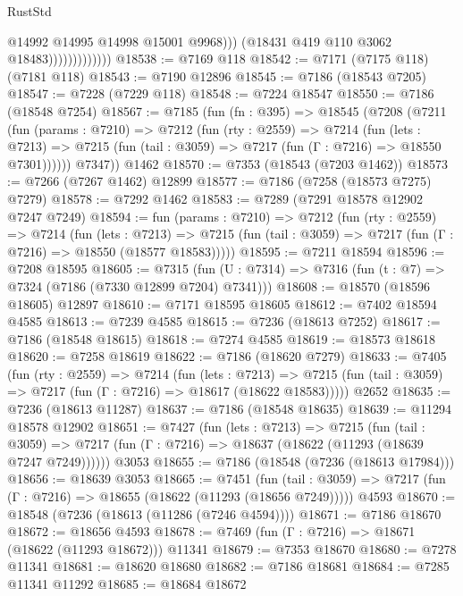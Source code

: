 \begin{lexlean}{RustStd}
\begin{coremodule}
                                  @14992
                                  @14995
                                  @14998
                                  @15001
                                  @9968)))
                            (@18431 @419 @110 @3062 @18483)))))))))))))
@18538 := @7169 @118
@18542 := @7171 (@7175 @118) (@7181 @118)
@18543 := @7190 @12896
@18545 := @7186 (@18543 @7205)
@18547 := @7228 (@7229 @118)
@18548 := @7224 @18547
@18550 := @7186 (@18548 @7254)
@18567 := @7185
    (fun (fn : @395) =>
    @18545
      (@7208
        (@7211
          (fun (params : @7210) =>
          @7212
            (fun (rty : @2559) =>
            @7214
              (fun (lets : @7213) =>
              @7215 (fun (tail : @3059) => @7217 (fun (Γ : @7216) => @18550 @7301))))))
        @7347))
    @1462
@18570 := @7353 (@18543 (@7203 @1462))
@18573 := @7266 (@7267 @1462) @12899
@18577 := @7186 (@7258 (@18573 @7275) @7279)
@18578 := @7292 @1462
@18583 := @7289 (@7291 @18578 @12902 @7247 @7249)
@18594 := fun (params : @7210) =>
  @7212
    (fun (rty : @2559) =>
    @7214
      (fun (lets : @7213) =>
      @7215 (fun (tail : @3059) => @7217 (fun (Γ : @7216) => @18550 (@18577 @18583)))))
@18595 := @7211 @18594
@18596 := @7208 @18595
@18605 := @7315
    (fun (U : @7314) => @7316 (fun (t : @7) => @7324 (@7186 (@7330 @12899 @7204) @7341)))
@18608 := @18570 (@18596 @18605) @12897
@18610 := @7171 @18595 @18605
@18612 := @7402 @18594 @4585
@18613 := @7239 @4585
@18615 := @7236 (@18613 @7252)
@18617 := @7186 (@18548 @18615)
@18618 := @7274 @4585
@18619 := @18573 @18618
@18620 := @7258 @18619
@18622 := @7186 (@18620 @7279)
@18633 := @7405
    (fun (rty : @2559) =>
    @7214
      (fun (lets : @7213) =>
      @7215 (fun (tail : @3059) => @7217 (fun (Γ : @7216) => @18617 (@18622 @18583)))))
    @2652
@18635 := @7236 (@18613 @11287)
@18637 := @7186 (@18548 @18635)
@18639 := @11294 @18578 @12902
@18651 := @7427
    (fun (lets : @7213) =>
    @7215
      (fun (tail : @3059) =>
      @7217 (fun (Γ : @7216) => @18637 (@18622 (@11293 (@18639 @7247 @7249))))))
    @3053
@18655 := @7186 (@18548 (@7236 (@18613 @17984)))
@18656 := @18639 @3053
@18665 := @7451
    (fun (tail : @3059) => @7217 (fun (Γ : @7216) => @18655 (@18622 (@11293 (@18656 @7249)))))
    @4593
@18670 := @18548 (@7236 (@18613 (@11286 (@7246 @4594))))
@18671 := @7186 @18670
@18672 := @18656 @4593
@18678 := @7469 (fun (Γ : @7216) => @18671 (@18622 (@11293 @18672))) @11341
@18679 := @7353 @18670
@18680 := @7278 @11341
@18681 := @18620 @18680
@18682 := @7186 @18681
@18684 := @7285 @11341 @11292
@18685 := @18684 @18672

\end{coremodule}
\end{lexlean}
